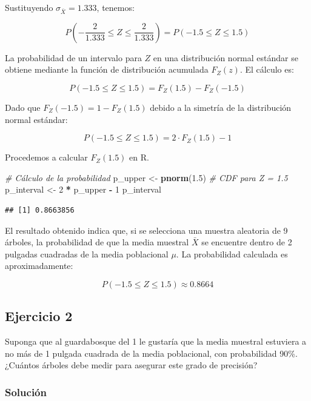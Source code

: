 \documentclass[
]{article}
\newenvironment{Shaded}{\begin{snugshade}}{\end{snugshade}}
\newcommand{\CommentTok}[1]{\textcolor[rgb]{0.56,0.35,0.01}{\textit{#1}}}
\newcommand{\DecValTok}[1]{\textcolor[rgb]{0.00,0.00,0.81}{#1}}
\newcommand{\FloatTok}[1]{\textcolor[rgb]{0.00,0.00,0.81}{#1}}
\newcommand{\FunctionTok}[1]{\textcolor[rgb]{0.13,0.29,0.53}{\textbf{#1}}}
\newcommand{\NormalTok}[1]{#1}
\newcommand{\OtherTok}[1]{\textcolor[rgb]{0.56,0.35,0.01}{#1}}
\newcommand{\SpecialCharTok}[1]{\textcolor[rgb]{0.81,0.36,0.00}{\textbf{#1}}}
\begin{document}
Sustituyendo \(\sigma_{\bar{X}} = 1.333\), tenemos:

\[
P\left(-\frac{2}{1.333} \leq Z \leq \frac{2}{1.333}\right) = P(-1.5 \leq Z \leq 1.5)
\]

La probabilidad de un intervalo para \(Z\) en una distribución normal estándar se obtiene mediante la función de distribución acumulada \(F_Z(z)\). El cálculo es:

\[
P(-1.5 \leq Z \leq 1.5) = F_Z(1.5) - F_Z(-1.5)
\]

Dado que \(F_Z(-1.5) = 1 - F_Z(1.5)\) debido a la simetría de la distribución normal estándar:

\[
P(-1.5 \leq Z \leq 1.5) = 2 \cdot F_Z(1.5) - 1
\]

Procedemos a calcular \(F_Z(1.5)\) en R.

\begin{Shaded}
\begin{Highlighting}[]
\CommentTok{\# Cálculo de la probabilidad}
\NormalTok{p\_upper }\OtherTok{\textless{}{-}} \FunctionTok{pnorm}\NormalTok{(}\FloatTok{1.5}\NormalTok{) }\CommentTok{\# CDF para Z = 1.5}
\NormalTok{p\_interval }\OtherTok{\textless{}{-}} \DecValTok{2} \SpecialCharTok{*}\NormalTok{ p\_upper }\SpecialCharTok{{-}} \DecValTok{1}
\NormalTok{p\_interval}
\end{Highlighting}
\end{Shaded}

\begin{verbatim}
## [1] 0.8663856
\end{verbatim}

El resultado obtenido indica que, si se selecciona una muestra aleatoria de 9 árboles, la probabilidad de que la media muestral \(\bar{X}\) se encuentre dentro de 2 pulgadas cuadradas de la media poblacional \(\mu\). La probabilidad calculada es aproximadamente:

\[
P(-1.5 \leq Z \leq 1.5) \approx 0.8664
\]

\subsection{Ejercicio 2}\label{ejercicio-2-1}

Suponga que al guardabosque del 1 le gustaría que la media muestral estuviera a no más de 1 pulgada cuadrada de la media poblacional, con probabilidad 90\%. ¿Cuántos árboles debe medir para asegurar este grado de precisión?

\subsubsection{Solución}\label{soluciuxf3n-6}
\end{document}
